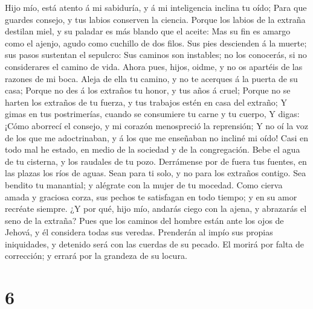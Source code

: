  Hijo mío, está atento á mi sabiduría, y á mi inteligencia
inclina tu oído;  Para que guardes consejo, y tus labios
conserven la ciencia.  Porque los labios de la extraña
destilan miel, y su paladar es más blando que el aceite: 
Mas su fin es amargo como el ajenjo, agudo como cuchillo de dos filos.
 Sus pies descienden á la muerte; sus pasos sustentan el
sepulcro:  Sus caminos son instables; no los conocerás, si
no considerares el camino de vida.  Ahora pues, hijos,
oidme, y no os apartéis de las razones de mi boca.  Aleja
de ella tu camino, y no te acerques á la puerta de su casa;
 Porque no des á los extraños tu honor, y tus años á
cruel;  Porque no se harten los extraños de tu fuerza, y
tus trabajos estén en casa del extraño;  Y gimas en tus
postrimerías, cuando se consumiere tu carne y tu cuerpo, 
Y digas: ¡Cómo aborrecí el consejo, y mi corazón menospreció la
reprensión;  Y no oí la voz de los que me adoctrinaban, y
á los que me enseñaban no incliné mi oído!  Casi en todo
mal he estado, en medio de la sociedad y de la congregación.
 Bebe el agua de tu cisterna, y los raudales de tu pozo.
 Derrámense por de fuera tus fuentes, en las plazas los
ríos de aguas.  Sean para ti solo, y no para los extraños
contigo.  Sea bendito tu manantial; y alégrate con la
mujer de tu mocedad.  Como cierva amada y graciosa corza,
sus pechos te satisfagan en todo tiempo; y en su amor recréate siempre.
 ¿Y por qué, hijo mío, andarás ciego con la ajena, y
abrazarás el seno de la extraña?  Pues que los caminos
del hombre están ante los ojos de Jehová, y él considera todas sus
veredas.  Prenderán al impío sus propias iniquidades, y
detenido será con las cuerdas de su pecado.  El morirá
por falta de corrección; y errará por la grandeza de su locura.

\hypertarget{section-5}{%
\section{6}\label{section-5}}

